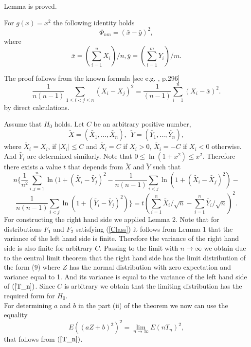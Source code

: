 \documentclass{svproc}
\begin{document}
Lemma is proved.

\begin{lemma} For $g(x)= x^2$ the following identity holds
$$
\Phi_{nm}= (\bar x - \bar y)^2,
$$
where
$$
\bar x = (\sum_{i=1}^n X_i)/n,
\bar y = (\sum_{i=1}^m Y_i)/m.
$$
\end{lemma}

The proof follows from the known formula [see e.g. \cite{Hoeffding}, p.296]
$$
\frac {1}{n(n-1)}\sum_{1\leq i<j\leq n
} (X_i-X_j)^2=\frac {1}{(n-1)} \sum_{i=1}^n (X_i - \bar x)^2.
$$
by  direct calculations.

Assume that $H_0$ holds. Let  $C$ be an arbitrary positive number,
$$
\tilde{X}=(\tilde{X_{1}},\ldots,\tilde{X_{n}}),\,\,\,
\tilde{Y}=(\tilde{Y_{1}},\ldots, \tilde{Y_{n}}),
$$
where $\tilde{X_{i}}=X_{i}$, if $
|X_{i}| \leq C$ and
 $\tilde{X_i}=C$ if $X_{i}>0$,
  $\tilde{X_i}=-C$ if $X_{i}<0$ otherwise. And $\tilde{Y_{i}}$ are determined similarly. Note that  $0 \leq \ln (1+x^2) \leq x^2$. Therefore there exists a value $t$ that depends from $\tilde{X}$ and $\tilde{Y}$ such that
\begin{equation}
n\{\frac{1}{n^2}\sum_{i,j=1}^n \ln(1 + (\tilde{X_{i}} - \tilde{Y_j})^2 -\frac{1}{n(n-1)}\sum_{i<j} \ln(1 + (\tilde{X_i} - \tilde{X_j})^2) -
\end{equation}
\begin{equation}\label{T_n}
 \frac{1}{n(n-1)}\sum_{i<j}  \ln(1 + (\tilde{Y_i} - \tilde{Y_j})^2)\}=
t
(\sum_{i=1}^n \tilde{X_{i}}/\sqrt{n}-\sum_{i=1}^n \tilde{Y_{i}}/\sqrt{n})^2.
\end{equation}
For constructing the right hand side we applied Lemma 2.
Note  that for distributions $F_1$ and $F_2$  satisfying (\ref{Class}) it follows from Lemma 1 that the variance of the left hand side is finite. Therefore the variance of the right hand side is also finite for arbitrary $C$.
Passing to the limit with $n\to \infty$ we obtain due to the central limit theorem that the right hand side has the limit distribution of the form (9) where  $Z$ has the normal distribution with zero expectation and variance equal to 1. And its variance  is equal to the variance of the left hand side  of $(\ref{T_n})$. Since $C$ is arbitrary we obtain that the limiting distribution has the required form for $H_0$. \\
 For determining $a$ and $b$ in the part (ii) of the theorem  we now can use the equality
 \begin{equation}\label{identity}
 E((aZ+b)^2)^2 =\lim_{n \to \infty}
 E(nT_n)^2,
 \end{equation}
 that follows from  $(\ref{T_n})$.
\end{document}

